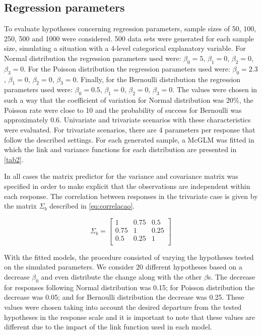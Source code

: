 \documentclass[AMA,STIX1COL]{WileyNJD-v2}
\begin{document}
\subsection{Regression parameters}

To evaluate hypotheses concerning regression parameters, sample sizes of 50, 100, 250, 500 and 1000 were considered. 500 data sets were generated for each sample size, simulating a situation with a 4-level categorical explanatory variable. For Normal distribution the regression parameters used were: $\beta_0 = 5$, $\beta_1 = 0$, $\beta_2 = 0$, $\beta_3 = 0$. For the Poisson distribution the regression parameters used were: $\beta_0 = 2.3$, $\beta_1 = 0$, $\beta_2 = 0$, $\beta_3 = 0$. Finally, for the Bernoulli distribution the regression parameters used were: $\beta_0 = 0.5$, $\beta_1 = 0$, $\beta_2 = 0$, $\beta_3 = 0$. The values were chosen in such a way that the coefficient of variation for Normal distribution was 20\%, the Poisson rate were close to 10 and the probability of success for Bernoulli was approximately 0.6. Univariate and trivariate scenarios with these characteristics were evaluated. For trivariate scenarios, there are 4 parameters per response that follow the described settings. For each generated sample, a McGLM was fitted in which the link and variance functions for each distribution are presented in \autoref{tab2}.

In all cases the matrix predictor for the variance and covariance matrix was specified in order to make explicit that the observations are independent within each response. The correlation between responses in the trivariate case is given by the matrix $\Sigma_b$ described in \autoref{eq:correlacao}.

\begin{equation} \label{eq:correlacao}
\Sigma_b = 
\begin{bmatrix}
1    & 0.75 & 0.5  \\
0.75 & 1    & 0.25 \\
0.5  & 0.25 & 1    \\
\end{bmatrix}
\end{equation}

With the fitted models, the procedure consisted of varying the hypotheses tested on the simulated parameters. We consider 20 different hypotheses based on a decrease $\beta_0$ and even distribute the change along with the other $\beta$s. The decrease for responses following Normal distribution was 0.15; for Poisson distribution the decrease was 0.05; and for Bernoulli distribution the decrease was 0.25. These values were chosen taking into account the desired departure from the tested hypotheses in the response scale and it is important to note that these values are different due to the impact of the link function used in each model.
\end{document}
